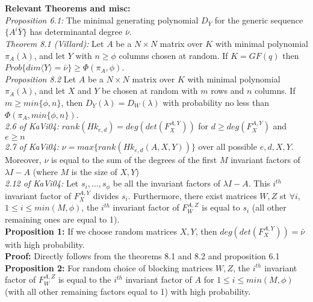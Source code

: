 \documentclass[12pt]{article}
\begin{document}
	
\noindent\textbf{Relevant Theorems and misc:}\\
\noindent\textit{Proposition 6.1:} The minimal generating polynomial $D_{\bar{Y}}$ for the generic
sequence $\{A^i\bar{Y}\}$ has determinantal degree $\bar{\nu}$.\\

\noindent\textit{Theorem 8.1 (Villard):} Let $A$ be a $N \times N$ matrix over $K$ with minimal polynomial $\pi_A(\lambda)$,
and let $Y$ with $n \ge \phi$ columns chosen at random. If $K = GF(q)$ then $Prob\{dim \langle Y \rangle = \bar{\nu} \} \ge
\Phi(\pi_A,\phi)$.\\

\noindent\textit{Proposition 8.2} Let $A$ be a $N \times N$ matrix over $K$ with minimal polynomial $\pi_A(\lambda)$,
and let $X$ and $Y$ be chosen at random with $m$ rows and $n$ columns. If $m \ge min\{\phi,n\}$, then $D_Y(\lambda) = D_W(\lambda)$
with probability no less than $\Phi(\pi_A,min\{\phi,n\})$.\\

\noindent\textit{2.6 of KaVi04:} $rank(Hk_{e,d}) = deg(det(F_X^{A,Y}))$ for $d \ge deg(F_X^{A,Y})$ and $e \ge n$\\

\noindent\textit{2.7 of KaVi04:} $\nu = max\{ rank(Hk_{e,d}(A,X,Y))\}$ over all possible $e,d,X,Y$. Moreover, $\nu$ is equal to the sum of the
degrees of the first $M$ invariant factors of $\lambda I -A$ (where $M$ is the size of $X,Y$)\\

\noindent\textit{2.12 of KaVi04:} Let $s_i,\dots, s_\phi$ be all the invariant factors of $\lambda I - A$. This $i^{th}$ invariant factor of
$F_X^{A,Y}$ divides $s_i$. Furthermore, there exist matrices $W,Z$ st $\forall i$, $1 \le i \le min(M,\phi)$, the $i^{th}$ invariant factor of
$F_W^{A,Z}$ is equal to $s_i$ (all other remaining ones are equal to 1).\\

\noindent\textbf{Proposition 1:} If we choose random matrices $X,Y$, then $deg(det(F_X^{A,Y})) = \bar{\nu}$ 
with high probability.\\

\noindent\textbf{Proof:} Directly follows from the theorems 8.1 and 8.2 and proposition 6.1\\

\noindent\textbf{Proposition 2:} For random choice of blocking matrices $W,Z$, the $i^{th}$ invariant factor of $F_W^{A,Z}$ is equal to the $i^{th}$ 
invariant factor of $A$ for $1 \le i \le min(M,\phi)$ (with all other remaining factors equal to 1) with high probability.\\
\end{document}
